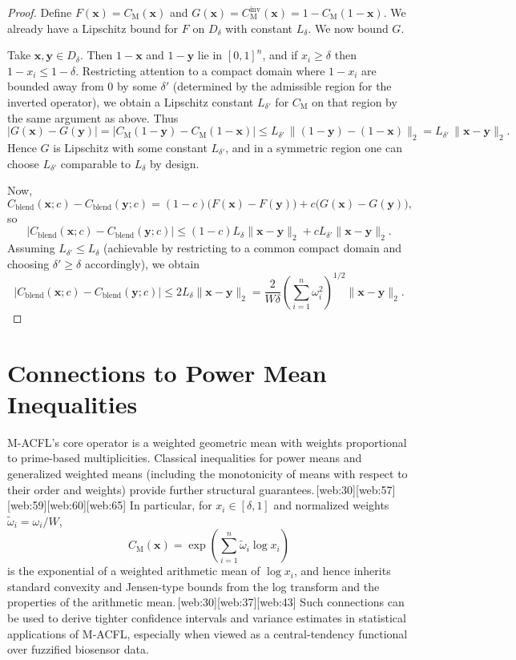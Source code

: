 \documentclass[11pt]{article}
\begin{document}
\begin{proof}
Define $F(\mathbf{x}) = C_{\mathrm{M}}(\mathbf{x})$ and $G(\mathbf{x}) = C_{\mathrm{M}}^{\mathrm{inv}}(\mathbf{x}) = 1 - C_{\mathrm{M}}(1-\mathbf{x})$. 
We already have a Lipschitz bound for $F$ on $D_\delta$ with constant $L_\delta$. 
We now bound $G$.

Take $\mathbf{x},\mathbf{y}\in D_\delta$. 
Then $1-\mathbf{x}$ and $1-\mathbf{y}$ lie in $[0,1]^n$, and if $x_i\ge \delta$ then $1-x_i \le 1 - \delta$. 
Restricting attention to a compact domain where $1-x_i$ are bounded away from $0$ by some $\delta'$ (determined by the admissible region for the inverted operator), we obtain a Lipschitz constant $L_{\delta'}$ for $C_{\mathrm{M}}$ on that region by the same argument as above. 
Thus
\[
|G(\mathbf{x}) - G(\mathbf{y})|
= \big|C_{\mathrm{M}}(1-\mathbf{y}) - C_{\mathrm{M}}(1-\mathbf{x})\big|
\le L_{\delta'}\,\|(1-\mathbf{y}) - (1-\mathbf{x})\|_2
= L_{\delta'}\,\|\mathbf{x}-\mathbf{y}\|_2.
\]
Hence $G$ is Lipschitz with some constant $L_{\delta'}$, and in a symmetric region one can choose $L_{\delta'}$ comparable to $L_\delta$ by design.

Now,
\[
C_{\mathrm{blend}}(\mathbf{x};c) - C_{\mathrm{blend}}(\mathbf{y};c)
= (1-c)\big(F(\mathbf{x})-F(\mathbf{y})\big)
+ c\big(G(\mathbf{x})-G(\mathbf{y})\big),
\]
so
\[
\big|C_{\mathrm{blend}}(\mathbf{x};c) - C_{\mathrm{blend}}(\mathbf{y};c)\big|
\le (1-c)L_\delta\|\mathbf{x}-\mathbf{y}\|_2 + cL_{\delta'}\|\mathbf{x}-\mathbf{y}\|_2.
\]
Assuming $L_{\delta'} \le L_\delta$ (achievable by restricting to a common compact domain and choosing $\delta' \ge \delta$ accordingly), we obtain
\[
\big|C_{\mathrm{blend}}(\mathbf{x};c) - C_{\mathrm{blend}}(\mathbf{y};c)\big|
\le 2L_\delta \|\mathbf{x}-\mathbf{y}\|_2
= \frac{2}{W\delta}\left(\sum_{i=1}^n \omega_i^2\right)^{1/2} \|\mathbf{x}-\mathbf{y}\|_2.
\]
\end{proof}

\section{Connections to Power Mean Inequalities}

M-ACFL's core operator is a weighted geometric mean with weights proportional to prime-based multiplicities. 
Classical inequalities for power means and generalized weighted means (including the monotonicity of means with respect to their order and weights) provide further structural guarantees.\,[web:30][web:57][web:59][web:60][web:65] 
In particular, for $x_i \in [\delta,1]$ and normalized weights $\tilde{\omega}_i = \omega_i/W$,
\[
C_{\mathrm{M}}(\mathbf{x})
= \exp\left(\sum_{i=1}^n \tilde{\omega}_i \log x_i\right)
\]
is the exponential of a weighted arithmetic mean of $\log x_i$, and hence inherits standard convexity and Jensen-type bounds from the log transform and the properties of the arithmetic mean.\,[web:30][web:37][web:43] 
Such connections can be used to derive tighter confidence intervals and variance estimates in statistical applications of M-ACFL, especially when viewed as a central-tendency functional over fuzzified biosensor data.
\end{document}
